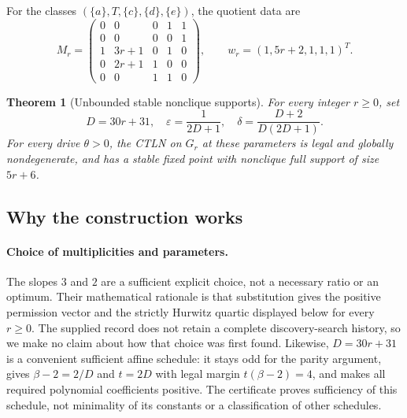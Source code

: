 \documentclass[11pt,a4paper]{article}
\newtheorem{theorem}{Theorem}[section]
\theoremstyle{definition}\newtheorem{definition}[theorem]{Definition}
\theoremstyle{remark}\newtheorem{remark}[theorem]{Remark}
\newcommand{\eps}{\varepsilon}
\begin{document}
For the classes $(\{a\},T,\{c\},\{d\},\{e\})$, the quotient data are
\begin{equation}\label{eq:familyquotient}
 M_r=\begin{pmatrix}
0&0&0&1&1\\
0&0&0&0&1\\
1&3r+1&0&1&0\\
0&2r+1&1&0&0\\
0&0&1&1&0
\end{pmatrix},\qquad
 w_r=(1,5r+2,1,1,1)^T.
\end{equation}

\begin{theorem}[Unbounded stable nonclique supports]\label{thm:family}
For every integer $r\geq0$, set
\begin{equation}\label{eq:familyparams}
 D=30r+31,\quad
 \eps=\frac1{2D+1},\quad
 \delta=\frac{D+2}{D(2D+1)}.
\end{equation}
For every drive $\theta>0$, the CTLN on $G_r$ at these parameters is legal and globally nondegenerate, and has a stable fixed point with nonclique full support of size $5r+6$.
\end{theorem}

\subsection{Why the construction works}
\paragraph{Choice of multiplicities and parameters.}
The slopes $3$ and $2$ are a sufficient explicit choice, not a necessary ratio or an optimum. Their mathematical rationale is that substitution gives the positive permission vector and the strictly Hurwitz quartic displayed below for every $r\geq0$. The supplied record does not retain a complete discovery-search history, so we make no claim about how that choice was first found. Likewise, $D=30r+31$ is a convenient sufficient affine schedule: it stays odd for the parity argument, gives $\beta-2=2/D$ and $t=2D$ with legal margin $t(\beta-2)=4$, and makes all required polynomial coefficients positive. The certificate proves sufficiency of this schedule, not minimality of its constants or a classification of other schedules.
\end{document}
